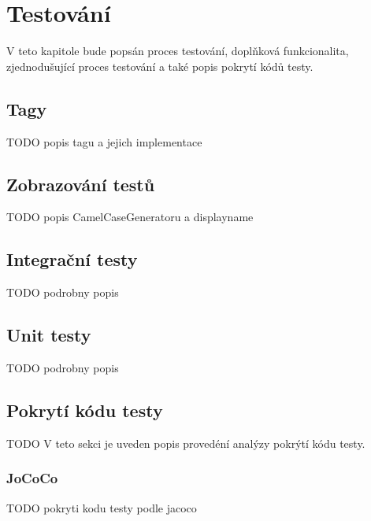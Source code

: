 \chapter{Testování}\label{testovani}
V teto kapitole bude popsán proces testování, doplňková funkcionalita, zjednodušující proces testování a také popis pokrytí kódů testy.
\section{Tagy}\label{testovani:tagy}
    TODO popis tagu a jejich implementace
\section{Zobrazování testů}\label{testovani:zobrazovani}
    TODO popis CamelCaseGeneratoru a displayname
\section{Integrační testy}\label{testovani:intergacni}
    TODO podrobny popis
\section{Unit testy}\label{testovani:unit}
    TODO podrobny popis
\section{Pokrytí kódu testy}\label{testovani:pokryti}
    TODO V teto sekci je uveden popis provedéní analýzy pokrýtí kódu testy.
    \subsection{JoCoCo}
    TODO pokryti kodu testy podle jacoco
    \cite{JoCoCo}

